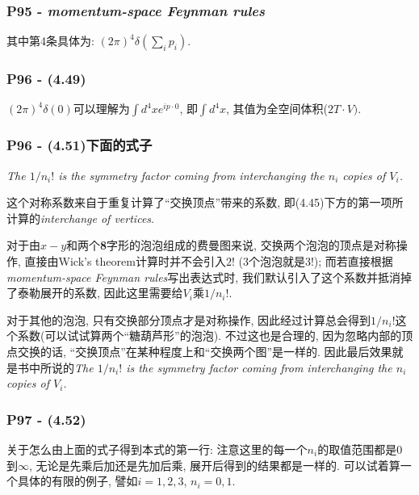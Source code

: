 \documentclass[cn,hazy,green,11pt,device=normal,chinesefont=founder]{elegantnote}
\begin{document}
\subsubsection{P95 - \textit{momentum-space Feynman rules}}

其中第4条具体为: $(2\pi)^4 \delta(\sum\limits_i p_i)$. 

\subsubsection{P96 - (4.49)}

$(2\pi)^4 \delta(0)$可以理解为$\int d^4x e^{ip\cdot 0}$, 即$\int d^4x$, 其值为全空间体积($2T\cdot V)$. 

\subsubsection{P96 - (4.51)下面的式子}

\textit{The $1/n_i !$ is the symmetry factor coming from interchanging the $n_i$ copies of $V_i$.}
\begin{remark}[个人理解]\mbox{}
  
  这个对称系数来自于重复计算了“交换顶点”带来的系数, 即(4.45)下方的第一项所计算的\textit{interchange of vertices}. 

  对于由$x-y$和两个\textbf{8}字形的泡泡组成的费曼图来说, 交换两个泡泡的顶点是对称操作, 直接由Wick's theorem计算时并不会引入$2!$ (3个泡泡就是$3!$); 而若直接根据\textit{momentum-space Feynman rules}写出表达式时, 我们默认引入了这个系数并抵消掉了泰勒展开的系数, 因此这里需要给$V_i$乘$1/n_i !$. 

  对于其他的泡泡, 只有交换部分顶点才是对称操作, 因此经过计算总会得到$1/n_i !$这个系数(可以试试算两个“糖葫芦形”的泡泡). 不过这也是合理的, 因为忽略内部的顶点交换的话, “交换顶点”在某种程度上和“交换两个图”是一样的. 因此最后效果就是书中所说的\textit{The $1/n_i !$ is the symmetry factor coming from interchanging the $n_i$ copies of $V_i$.}

\end{remark}

\subsubsection{P97 - (4.52)}

关于怎么由上面的式子得到本式的第一行: 注意这里的每一个$n_i$的取值范围都是0到$\infty$, 无论是先乘后加还是先加后乘, 展开后得到的结果都是一样的. 可以试着算一个具体的有限的例子, 譬如$i = 1, 2, 3$, $n_i = 0, 1$.   
\end{document}
